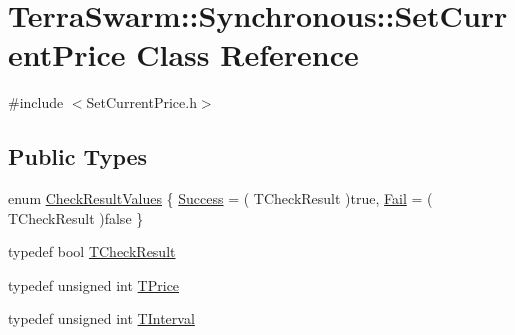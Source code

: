 \hypertarget{class_terra_swarm_1_1_synchronous_1_1_set_current_price}{\section{Terra\-Swarm\-:\-:Synchronous\-:\-:Set\-Current\-Price Class Reference}
\label{class_terra_swarm_1_1_synchronous_1_1_set_current_price}
}


{\ttfamily \#include $<$Set\-Current\-Price.\-h$>$}

\subsection*{Public Types}
\begin{DoxyCompactItemize}
\item 
enum \hyperlink{class_terra_swarm_1_1_synchronous_1_1_set_current_price_a0234ba20aa9372d9aaee3948bd008909}{Check\-Result\-Values} \{ \hyperlink{class_terra_swarm_1_1_synchronous_1_1_set_current_price_a0234ba20aa9372d9aaee3948bd008909a15e21f3992df9723770d59fa064c3827}{Success} = ( T\-Check\-Result )true, 
\hyperlink{class_terra_swarm_1_1_synchronous_1_1_set_current_price_a0234ba20aa9372d9aaee3948bd008909a67c062540d8320b92b10a0f371dbc32b}{Fail} = ( T\-Check\-Result )false
 \}
\item 
typedef bool \hyperlink{class_terra_swarm_1_1_synchronous_1_1_set_current_price_aeed4ef4c867719626ede15e2f8718436}{T\-Check\-Result}
\item 
typedef unsigned int \hyperlink{class_terra_swarm_1_1_synchronous_1_1_set_current_price_a2ed14f2a90070d19a70183bb63e7708e}{T\-Price}
\item 
typedef unsigned int \hyperlink{class_terra_swarm_1_1_synchronous_1_1_set_current_price_aa87902078a0788d13ef70b899d83f4d3}{T\-Interval}
\end{DoxyCompactItemize}

